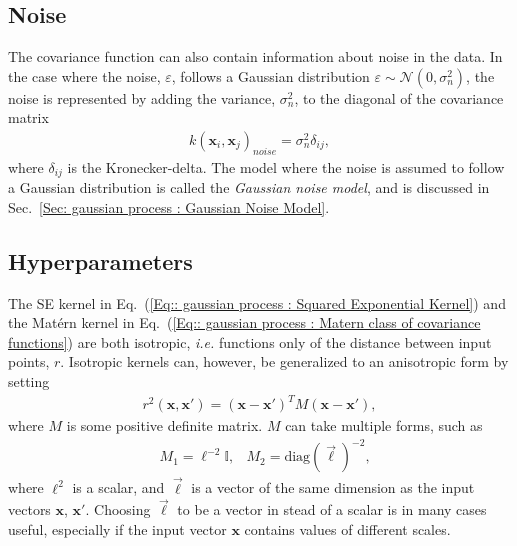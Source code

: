 \documentclass[twoside,english]{uiofysmaster}
\begin{document}
\subsection{Noise}\label{Sec:: gaussian process : Noise Covariance Function}


The covariance function can also contain information about noise in the data. In the case where the noise, $\varepsilon$, follows a Gaussian distribution $\varepsilon \sim \mathcal{N}(0, \sigma_n^2)$, the noise is represented by adding the variance, $\sigma_n^2$, to the diagonal of the covariance matrix
\begin{align}
k(\textbf{x}_i, \textbf{x}_j)_{noise} = \sigma^2_n \delta_{ij},
\end{align}
where $\delta_{ij}$ is the Kronecker-delta. The model where the noise is assumed to follow a Gaussian distribution is called the \textit{Gaussian noise model}, and is discussed in Sec.~\ref{Sec: gaussian process : Gaussian Noise Model}. %

\subsection{Hyperparameters}\label{Sec:: gaussian process : Hyperparameters}

The SE kernel in Eq.~(\ref{Eq:: gaussian process : Squared Exponential Kernel}) and the Mat\'{e}rn kernel in Eq.~(\ref{Eq:: gaussian process : Matern class of covariance functions}) are both isotropic, \textit{i.e.} functions only of the distance between input points, $r$. Isotropic kernels can, however, be generalized to an anisotropic form by setting
\begin{align}
r^2(\textbf{x}, \textbf{x}') = (\textbf{x} - \textbf{x}')^T M(\textbf{x} - \textbf{x}'),
\end{align}
where $M$ is some positive definite matrix. $M$ can take multiple forms, such as 
\begin{align}
&M_1 = \ell^{-2} \mathbb{I} , &M_2 = \text{diag}(\vec{\ell})^{-2},
\end{align}
where $\ell^2$ is a scalar, and $\vec{\ell}$ is a vector of the same dimension as the input vectors $\textbf{x}$, $\textbf{x}'$. Choosing $\vec{\ell}$ to be a vector in stead of a scalar is in many cases useful, especially if the input vector $\textbf{x}$ contains values of different scales.
\end{document}
